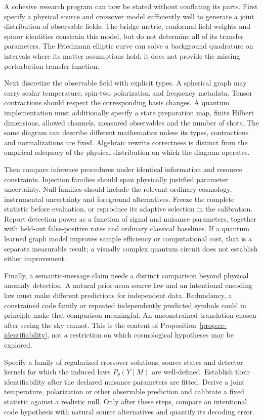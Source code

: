 A cohesive research program can now be stated without conflating its
parts. First specify a physical source and crossover model sufficiently
well to generate a joint distribution of observable fields. The bridge
metric, conformal field weights and spinor identities constrain this
model, but do not determine all of its transfer parameters. The
Friedmann elliptic curve can solve a background quadrature on intervals
where its matter assumptions hold; it does not provide the missing
perturbation transfer function.

Next discretize the observable field with explicit types. A spherical
graph may carry scalar temperature, spin-two polarization and frequency
metadata. Tensor contractions should respect the corresponding basis
changes. A quantum implementation must additionally specify a state
preparation map, finite Hilbert dimensions, allowed channels, measured
observables and the number of shots. The same diagram can describe
different mathematics unless its types, contractions and normalizations
are fixed. Algebraic rewrite correctness is distinct from the empirical
adequacy of the physical distribution on which the diagram operates.

Then compare inference procedures under identical information and
resource constraints. Injection families should span physically justified
parameter uncertainty. Null families should include the relevant ordinary
cosmology, instrumental uncertainty and foreground alternatives. Freeze
the complete statistic before evaluation, or reproduce its adaptive
selection in the calibration. Report detection power as a function of
signal and nuisance parameters, together with held-out false-positive
rates and ordinary classical baselines. If a quantum learned graph model
improves sample efficiency or computational cost, that is a separate
measurable result; a visually complex quantum circuit does not establish
either improvement.

Finally, a semantic-message claim needs a distinct comparison beyond
physical anomaly detection. A natural prior-aeon source law and an
intentional encoding law must make different predictions for independent
data. Redundancy, a constrained code family or repeated independently
predicted symbols could in principle make that comparison meaningful.
An unconstrained translation chosen after seeing the sky cannot. This
is the content of Proposition~\ref{prop:cc-identifiability}, not a
restriction on which cosmological hypotheses may be explored.

\begin{problem}
Specify a family of regularized crossover solutions, source states and
detector kernels for which the induced laws $P_\theta(Y\mid M)$ are
well-defined. Establish their identifiability after the declared nuisance
parameters are fitted. Derive a joint temperature, polarization or other
observable prediction and calibrate a fixed statistic against a realistic
null. Only after these steps, compare an intentional code hypothesis with
natural source alternatives and quantify its decoding error.
\end{problem}

